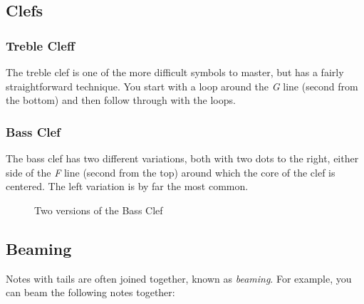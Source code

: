 \subsection*{Clefs}

\subsubsection*{Treble Cleff}

The treble clef is one of the more difficult symbols to master, but has a fairly straightforward technique. You start with a loop around the \emph{G} line (second from the bottom) and then follow through with the loops.

\begin{figure}[h!]
  \centering
  \label{fig:TrebleClef}
\end{figure}

\subsubsection*{Bass Clef}

The bass clef has two different variations, both with two dots to the right, either side of the \emph{F} line (second from the top) around which the core of the clef is centered. The left variation is by far the most common.

\begin{figure}[h!]
  \centering
  \caption{Two versions of the Bass Clef}
  \label{fig:BassClef}
\end{figure}

\subsection*{Beaming}

Notes with tails are often joined together, known as \emph{beaming}. For example, you can beam the following notes together:

